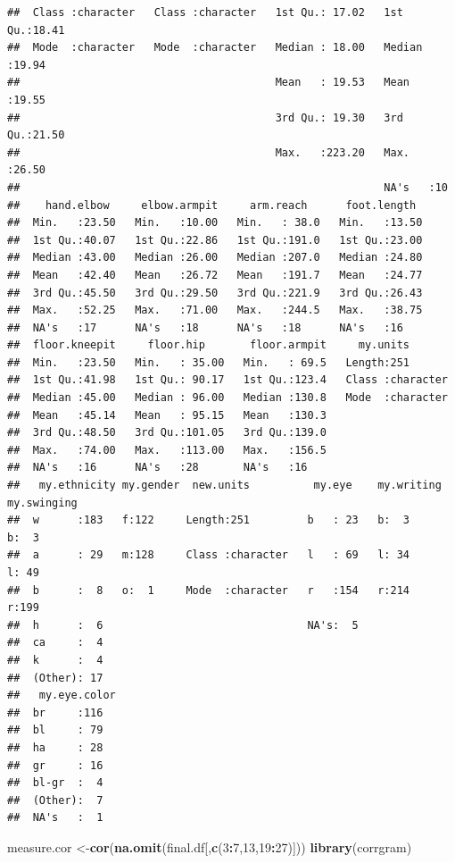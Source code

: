 \documentclass[]{article}
\newenvironment{Shaded}{\begin{snugshade}}{\end{snugshade}}
\newcommand{\DecValTok}[1]{\textcolor[rgb]{0.00,0.00,0.81}{#1}}
\newcommand{\KeywordTok}[1]{\textcolor[rgb]{0.13,0.29,0.53}{\textbf{#1}}}
\newcommand{\NormalTok}[1]{#1}
\newcommand{\OperatorTok}[1]{\textcolor[rgb]{0.81,0.36,0.00}{\textbf{#1}}}
\begin{document}
\begin{verbatim}
##  Class :character   Class :character   1st Qu.: 17.02   1st Qu.:18.41  
##  Mode  :character   Mode  :character   Median : 18.00   Median :19.94  
##                                        Mean   : 19.53   Mean   :19.55  
##                                        3rd Qu.: 19.30   3rd Qu.:21.50  
##                                        Max.   :223.20   Max.   :26.50  
##                                                         NA's   :10     
##    hand.elbow     elbow.armpit     arm.reach      foot.length   
##  Min.   :23.50   Min.   :10.00   Min.   : 38.0   Min.   :13.50  
##  1st Qu.:40.07   1st Qu.:22.86   1st Qu.:191.0   1st Qu.:23.00  
##  Median :43.00   Median :26.00   Median :207.0   Median :24.80  
##  Mean   :42.40   Mean   :26.72   Mean   :191.7   Mean   :24.77  
##  3rd Qu.:45.50   3rd Qu.:29.50   3rd Qu.:221.9   3rd Qu.:26.43  
##  Max.   :52.25   Max.   :71.00   Max.   :244.5   Max.   :38.75  
##  NA's   :17      NA's   :18      NA's   :18      NA's   :16     
##  floor.kneepit     floor.hip       floor.armpit     my.units        
##  Min.   :23.50   Min.   : 35.00   Min.   : 69.5   Length:251        
##  1st Qu.:41.98   1st Qu.: 90.17   1st Qu.:123.4   Class :character  
##  Median :45.00   Median : 96.00   Median :130.8   Mode  :character  
##  Mean   :45.14   Mean   : 95.15   Mean   :130.3                     
##  3rd Qu.:48.50   3rd Qu.:101.05   3rd Qu.:139.0                     
##  Max.   :74.00   Max.   :113.00   Max.   :156.5                     
##  NA's   :16      NA's   :28       NA's   :16                        
##   my.ethnicity my.gender  new.units          my.eye    my.writing my.swinging
##  w      :183   f:122     Length:251         b   : 23   b:  3      b:  3      
##  a      : 29   m:128     Class :character   l   : 69   l: 34      l: 49      
##  b      :  8   o:  1     Mode  :character   r   :154   r:214      r:199      
##  h      :  6                                NA's:  5                         
##  ca     :  4                                                                 
##  k      :  4                                                                 
##  (Other): 17                                                                 
##   my.eye.color
##  br     :116  
##  bl     : 79  
##  ha     : 28  
##  gr     : 16  
##  bl-gr  :  4  
##  (Other):  7  
##  NA's   :  1
\end{verbatim}

\begin{Shaded}
\begin{Highlighting}[]
\NormalTok{measure.cor \textless{}{-}}\KeywordTok{cor}\NormalTok{(}\KeywordTok{na.omit}\NormalTok{(final.df[,}\KeywordTok{c}\NormalTok{(}\DecValTok{3}\OperatorTok{:}\DecValTok{7}\NormalTok{,}\DecValTok{13}\NormalTok{,}\DecValTok{19}\OperatorTok{:}\DecValTok{27}\NormalTok{)]))}
\KeywordTok{library}\NormalTok{(corrgram)}
\end{Highlighting}
\end{Shaded}
\end{document}
